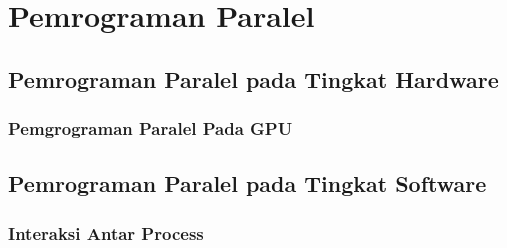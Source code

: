 \section{Pemrograman Paralel}
\blindtext
\subsection{Pemrograman Paralel pada Tingkat Hardware}
\blindtext
\subsubsection{Pemgrograman Paralel Pada GPU}
\blindtext
\subsection{Pemrograman Paralel pada Tingkat Software}
\blindtext
\subsubsection{Interaksi Antar Process}
\blindtext
